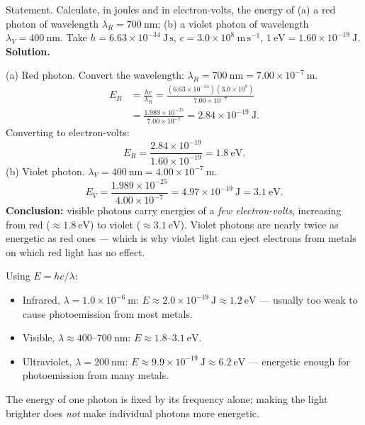 \documentclass[11pt]{article}
\begin{document}
\begin{exoresolu}
Statement. Calculate, in joules and in electron-volts, the energy of (a) a red photon of wavelength $\lambda_R = 700\ \mathrm{nm}$; (b) a violet photon of wavelength $\lambda_V = 400\ \mathrm{nm}$. Take $h = 6.63 \times 10^{-34}\ \mathrm{J\,s}$, $c = 3.0 \times 10^{8}\ \mathrm{m\,s^{-1}}$, $1\ \mathrm{eV} = 1.60 \times 10^{-19}\ \mathrm{J}$.
\tcblower
\textbf{Solution.}\par
(a) Red photon. Convert the wavelength: $\lambda_R = 700\ \mathrm{nm} = 7.00 \times 10^{-7}\ \mathrm{m}$.
\begin{align*}
E_R &= \frac{hc}{\lambda_R} = \frac{(6.63 \times 10^{-34})(3.0 \times 10^{8})}{7.00 \times 10^{-7}} \\
&= \frac{1.989 \times 10^{-25}}{7.00 \times 10^{-7}} = 2.84 \times 10^{-19}\ \mathrm{J}.
\end{align*}
Converting to electron-volts:
\[ E_R = \frac{2.84 \times 10^{-19}}{1.60 \times 10^{-19}} = 1.8\ \mathrm{eV}. \]
(b) Violet photon. $\lambda_V = 400\ \mathrm{nm} = 4.00 \times 10^{-7}\ \mathrm{m}$.
\[ E_V = \frac{1.989 \times 10^{-25}}{4.00 \times 10^{-7}} = 4.97 \times 10^{-19}\ \mathrm{J} = 3.1\ \mathrm{eV}. \]
\textbf{Conclusion:} visible photons carry energies of a \emph{few electron-volts}, increasing from red ($\approx 1.8\ \mathrm{eV}$) to violet ($\approx 3.1\ \mathrm{eV}$). Violet photons are nearly twice as energetic as red ones --- which is why violet light can eject electrons from metals on which red light has no effect.
\end{exoresolu}

\begin{exemplebox}
Using $E = hc/\lambda$:
\begin{itemize}
\item Infrared, $\lambda = 1.0 \times 10^{-6}\ \mathrm{m}$: $E \approx 2.0 \times 10^{-19}\ \mathrm{J} \approx 1.2\ \mathrm{eV}$ --- usually too weak to cause photoemission from most metals.
\item Visible, $\lambda \approx 400$--$700\ \mathrm{nm}$: $E \approx 1.8$--$3.1\ \mathrm{eV}$.
\item Ultraviolet, $\lambda = 200\ \mathrm{nm}$: $E \approx 9.9 \times 10^{-19}\ \mathrm{J} \approx 6.2\ \mathrm{eV}$ --- energetic enough for photoemission from many metals.
\end{itemize}
The energy of one photon is fixed by its frequency alone; making the light brighter does \emph{not} make individual photons more energetic.
\end{exemplebox}
\end{document}
